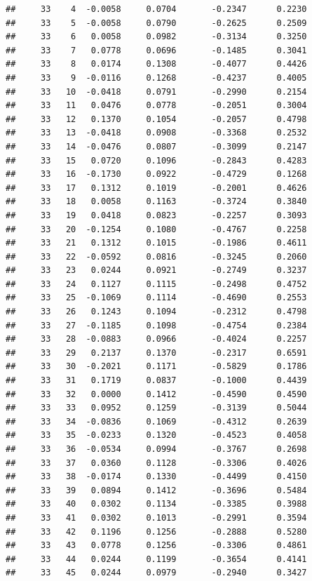 \documentclass[
]{article}
\begin{document}
\begin{verbatim}
##     33    4  -0.0058     0.0704       -0.2347      0.2230  
##     33    5  -0.0058     0.0790       -0.2625      0.2509  
##     33    6   0.0058     0.0982       -0.3134      0.3250  
##     33    7   0.0778     0.0696       -0.1485      0.3041  
##     33    8   0.0174     0.1308       -0.4077      0.4426  
##     33    9  -0.0116     0.1268       -0.4237      0.4005  
##     33   10  -0.0418     0.0791       -0.2990      0.2154  
##     33   11   0.0476     0.0778       -0.2051      0.3004  
##     33   12   0.1370     0.1054       -0.2057      0.4798  
##     33   13  -0.0418     0.0908       -0.3368      0.2532  
##     33   14  -0.0476     0.0807       -0.3099      0.2147  
##     33   15   0.0720     0.1096       -0.2843      0.4283  
##     33   16  -0.1730     0.0922       -0.4729      0.1268  
##     33   17   0.1312     0.1019       -0.2001      0.4626  
##     33   18   0.0058     0.1163       -0.3724      0.3840  
##     33   19   0.0418     0.0823       -0.2257      0.3093  
##     33   20  -0.1254     0.1080       -0.4767      0.2258  
##     33   21   0.1312     0.1015       -0.1986      0.4611  
##     33   22  -0.0592     0.0816       -0.3245      0.2060  
##     33   23   0.0244     0.0921       -0.2749      0.3237  
##     33   24   0.1127     0.1115       -0.2498      0.4752  
##     33   25  -0.1069     0.1114       -0.4690      0.2553  
##     33   26   0.1243     0.1094       -0.2312      0.4798  
##     33   27  -0.1185     0.1098       -0.4754      0.2384  
##     33   28  -0.0883     0.0966       -0.4024      0.2257  
##     33   29   0.2137     0.1370       -0.2317      0.6591  
##     33   30  -0.2021     0.1171       -0.5829      0.1786  
##     33   31   0.1719     0.0837       -0.1000      0.4439  
##     33   32   0.0000     0.1412       -0.4590      0.4590  
##     33   33   0.0952     0.1259       -0.3139      0.5044  
##     33   34  -0.0836     0.1069       -0.4312      0.2639  
##     33   35  -0.0233     0.1320       -0.4523      0.4058  
##     33   36  -0.0534     0.0994       -0.3767      0.2698  
##     33   37   0.0360     0.1128       -0.3306      0.4026  
##     33   38  -0.0174     0.1330       -0.4499      0.4150  
##     33   39   0.0894     0.1412       -0.3696      0.5484  
##     33   40   0.0302     0.1134       -0.3385      0.3988  
##     33   41   0.0302     0.1013       -0.2991      0.3594  
##     33   42   0.1196     0.1256       -0.2888      0.5280  
##     33   43   0.0778     0.1256       -0.3306      0.4861  
##     33   44   0.0244     0.1199       -0.3654      0.4141  
##     33   45   0.0244     0.0979       -0.2940      0.3427  

\end{verbatim}
\end{document}
